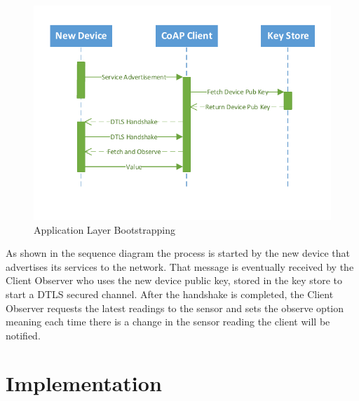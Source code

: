 \begin{figure}[h]
  \centering
  \includegraphics[width=0.8\linewidth]{figures/Sequence_Application_Admission.pdf}
  \caption{Application Layer Bootstrapping}
  \label{fig:sequence_application_admission}
\end{figure}

As shown in the sequence diagram the process is started by the new device that advertises its services to the network. That message is eventually received by the Client Observer who uses the new device public key, stored in the key store to start a \gls{DTLS} secured channel. After the handshake is completed, the Client Observer requests the latest readings to the sensor and sets the observe option meaning each time there is a change in the sensor reading the client will be notified.

\section{Implementation}


